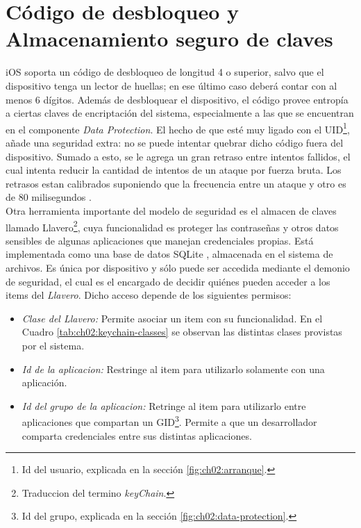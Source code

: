 \section{Código de desbloqueo y Almacenamiento seguro de claves}
iOS soporta un código de desbloqueo de longitud 4 o superior, salvo que el dispositivo tenga un lector de huellas; en ese \'ultimo caso deber\'a contar con al menos 6 d\'igitos. Además de desbloquear el dispositivo, el código provee entropía a ciertas claves de encriptación del sistema, especialmente a las que se encuentran en el componente \textit{Data Protection}. El hecho de que esté muy ligado con el UID\footnote{Id del usuario, explicada en la secci\'on \ref{fig:ch02:arranque}.}, añade una seguridad extra: no se puede intentar quebrar dicho código fuera del dispositivo. Sumado a esto, se le agrega un gran retraso entre intentos fallidos, el cual intenta reducir la cantidad de intentos de un ataque por fuerza bruta. Los retrasos estan calibrados suponiendo que la frecuencia entre un ataque y otro es de 80 milisegundos \cite{asg}.\\
Otra herramienta importante del modelo de seguridad es el almacen de claves llamado Llavero\footnote{Traduccion del termino \textit{keyChain}.}, cuya funcionalidad es proteger las contraseñas y otros datos sensibles de algunas aplicaciones que manejan credenciales propias. Est\'a implementada como una base de datos SQLite \cite{asg}, almacenada en el sistema de archivos. Es única por dispositivo y sólo puede ser accedida mediante el demonio de seguridad, el cual es el encargado de decidir quiénes pueden acceder a los items del \textit{Llavero}. Dicho acceso depende de los siguientes permisos:
\begin{itemize}
\item \emph{Clase del \textit{Llavero}:} Permite asociar un item con su funcionalidad. En el Cuadro \ref{tab:ch02:keychain-classes} se observan las distintas clases provistas por el sistema.
\item \emph{Id de la aplicacion:} Restringe al item para utilizarlo solamente con una aplicaci\'on.
\item \emph{Id del grupo de la aplicacion:} Retringe al item para utilizarlo entre aplicaciones que compartan un GID\footnote{Id del grupo, explicada en la secci\'on \ref{fig:ch02:data-protection}.}. Permite a que un desarrollador comparta credenciales entre sus distintas aplicaciones.
\end{itemize}
